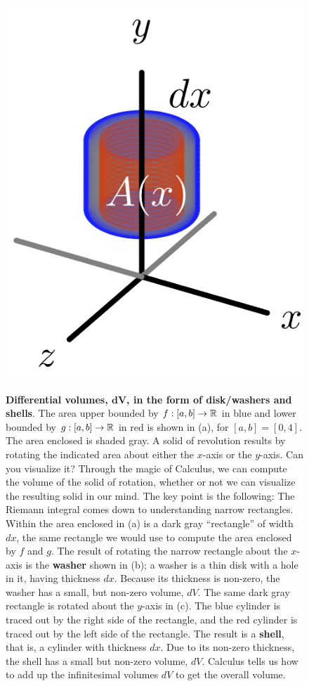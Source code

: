 \begin{figure}[hbt]
{\includegraphics[height=0.5\columnwidth]{graphics/Chap03/rotateRectangleAboutY01.png}}%
    \caption[]{\textbf{Differential volumes, $\bm{dV}$, in the form of disk/washers and shells}. The area upper bounded by $f:[a, b] \to \mathbb R$ in blue and lower bounded by $g:[a, b] \to \mathbb R$ in red is shown in (a), for $[a, b]=[0, 4]$. The area enclosed is shaded gray. A solid of revolution results by rotating the indicated area about either the $x$-axis or the $y$-axis. Can you visualize it? Through the magic of Calculus, we can compute the volume of the solid of rotation, whether or not we can visualize the resulting solid in our mind. The key point is the following: The Riemann integral comes down to understanding narrow rectangles. Within the area enclosed in (a) is a dark gray ``rectangle'' of width $dx$, the same rectangle we would use to compute the area enclosed by $f$ and $g$. The result of rotating the narrow rectangle about the $x$-axis is the \textbf{washer} shown in (b); a washer is a thin disk with a hole in it, having thickness $dx$. Because its thickness is non-zero, the washer has a small, but non-zero volume, $dV$. The same dark gray rectangle is rotated about the $y$-axis in (c). The blue cylinder is traced out by the right side of the rectangle, and the red cylinder is traced out by the left side of the rectangle. The result is a \textbf{shell}, that is, a cylinder with thickness $dx$. Due to its non-zero thickness, the shell has a small but non-zero volume, $dV$. Calculus tells us how to add up the infinitesimal volumes $dV$ to get the overall volume.}
    \label{fig:introSolidRevolutionAboutXorYaxes}
\end{figure}
\clearpage

